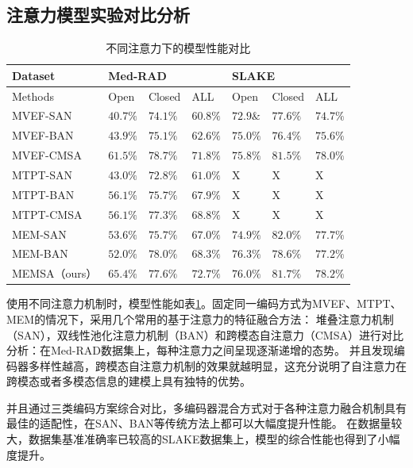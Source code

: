 \subsection{注意力模型实验对比分析}
\begin{table}
	\caption{\label{tab:modal_red_cmp2}不同注意力下的模型性能对比}
	\centering
	\small
	\begin{tabular}{l|lll|lll}
		\hline Dataset & \multicolumn{3}{l}{\textbf{Med-RAD}} & \multicolumn{3}{|l}{\textbf{SLAKE}} \\ 
		\hline Methods & Open & Closed & ALL & Open & Closed & ALL\\
		\hline MVEF-SAN\cite{nguyen2019overcoming} & $40.7 \%$ & $74.1 \%$ & $60.8 \%$ & $72.9 \&$ & $77.6 \%$ & $74.7 \%$\\
		MVEF-BAN\cite{nguyen2019overcoming} & $43.9 \%$ & $75.1 \%$ & $62.6 \%$ & $75.0 \%$ & $76.4 \%$ & $75.6 \%$\\
		MVEF-CMSA & $61.5 \%$ & $78.7 \%$ & $71.8 \%$ & $75.8 \%$ & $81.5 \%$ & $78.0 \%$\\
		\hline MTPT-SAN & $43.0 \%$ & $72.8 \%$ & $61.0 \%$ & X & X & X\\
		MTPT-BAN\cite{gong2021cross} & $56.1 \%$ & $75.7 \%$ & $67.9 \%$ & X & X & X\\
		MTPT-CMSA\cite{gong2021cross} & $56.1 \%$ & $77.3 \%$ & $68.8 \%$ & X & X & X\\
		\hline MEM-SAN & $53.6 \%$ & $75.7 \%$ & $67.0 \%$ & $74.9 \%$ & $82.0 \%$ & $77.7 \%$\\
		MEM-BAN & $52.0 \%$ & $78.0 \%$ & $68.3 \%$ & $\mathbf{76.3} \%$ & $78.6 \%$ & $77.2 \%$\\
		MEMSA（ours） & $\mathbf{65.4 \%}$ & $77.6 \%$ & $\mathbf{72.7 \%}$ & $76.0 \%$ & $81.7 \%$ & $\mathbf{78.2 \%}$\\
		\hline
		\end{tabular}
\end{table}
使用不同注意力机制时，模型性能如表\ref{tab:modal_red_cmp2}。固定同一编码方式为MVEF、MTPT、MEM的情况下，采用几个常用的基于注意力的特征融合方法：
堆叠注意力机制（SAN），双线性池化注意力机制（BAN）和跨模态自注意力（CMSA）进行对比分析：在Med-RAD数据集上，每种注意力之间呈现逐渐递增的态势。
并且发现编码器多样性越高，跨模态自注意力机制的效果就越明显，这充分说明了自注意力在跨模态或者多模态信息的建模上具有独特的优势。

并且通过三类编码方案综合对比，多编码器混合方式对于各种注意力融合机制具有最佳的适配性，在SAN、BAN等传统方法上都可以大幅度提升性能。
在数据量较大，数据集基准准确率已较高的SLAKE数据集上，模型的综合性能也得到了小幅度提升。

